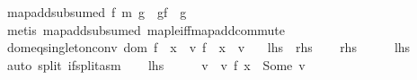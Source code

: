 \begin{isabellebody}
%
\isadelimproof
\isanewline
%
\endisadelimproof
\isanewline
{}\isamarkupfalse%
\ map{\isacharunderscore}{\kern0pt}add{\isacharunderscore}{\kern0pt}subsumed{}{\isacharcolon}{\kern0pt}\ {\isachardoublequoteopen}f\ {\isasymsubseteq}\isactrlsub m\ g\ {\isasymLongrightarrow}\ g{\isacharplus}{\kern0pt}{\isacharplus}{\kern0pt}f\ {\isacharequal}{\kern0pt}\ g{\isachardoublequoteclose}\isanewline
%
\isadelimproof
%
\endisadelimproof
%
\isatagproof
{}\isamarkupfalse%
\ {\isacharparenleft}{\kern0pt}metis\ map{\isacharunderscore}{\kern0pt}add{\isacharunderscore}{\kern0pt}subsumed{}\ map{\isacharunderscore}{\kern0pt}le{\isacharunderscore}{\kern0pt}iff{\isacharunderscore}{\kern0pt}map{\isacharunderscore}{\kern0pt}add{\isacharunderscore}{\kern0pt}commute{\isacharparenright}{\kern0pt}%
\endisatagproof
{\isafoldproof}%
%
\isadelimproof
\isanewline
%
\endisadelimproof
\isanewline
{}\isamarkupfalse%
\ dom{\isacharunderscore}{\kern0pt}eq{\isacharunderscore}{\kern0pt}singleton{\isacharunderscore}{\kern0pt}conv{\isacharcolon}{\kern0pt}\ {\isachardoublequoteopen}dom\ f\ {\isacharequal}{\kern0pt}\ {\isacharbraceleft}{\kern0pt}x{\isacharbraceright}{\kern0pt}\ {\isasymlongleftrightarrow}\ {\isacharparenleft}{\kern0pt}{\isasymexists}v{\isachardot}{\kern0pt}\ f\ {\isacharequal}{\kern0pt}\ {\isacharbrackleft}{\kern0pt}x\ {\isasymmapsto}\ v{\isacharbrackright}{\kern0pt}{\isacharparenright}{\kern0pt}{\isachardoublequoteclose}\isanewline
\ \ {\isacharparenleft}{\kern0pt}\ {\isachardoublequoteopen}{\isacharquery}{\kern0pt}lhs\ {\isasymlongleftrightarrow}\ {\isacharquery}{\kern0pt}rhs{\isachardoublequoteclose}{\isacharparenright}{\kern0pt}\isanewline
%
\isadelimproof
%
\endisadelimproof
%
\isatagproof
{}\isamarkupfalse%
\isanewline
\ \ \isamarkupfalse%
\ {\isacharquery}{\kern0pt}rhs\isanewline
\ \ \isamarkupfalse%
\ \isamarkupfalse%
\ {\isacharquery}{\kern0pt}lhs\ \isamarkupfalse%
\ {\isacharparenleft}{\kern0pt}auto\ split{\isacharcolon}{\kern0pt}\ if{\isacharunderscore}{\kern0pt}split{\isacharunderscore}{\kern0pt}asm{\isacharparenright}{\kern0pt}\isanewline
{}\isamarkupfalse%
\isanewline
\ \ \isamarkupfalse%
\ {\isacharquery}{\kern0pt}lhs\isanewline
\ \ \isamarkupfalse%
\ \isamarkupfalse%
\ v\ \ v{\isacharcolon}{\kern0pt}\ {\isachardoublequoteopen}f\ x\ {\isacharequal}{\kern0pt}\ Some\ v{\isachardoublequoteclose}\ \isamarkupfalse%

\end{isabellebody}
